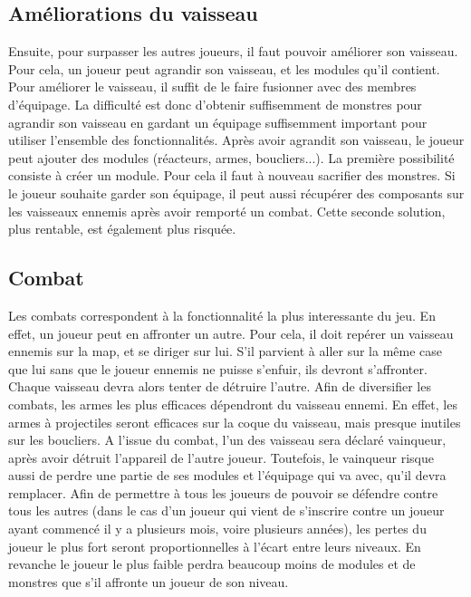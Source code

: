 \documentclass[a4paper,11pt]{report}
\begin{document}
    \subsection{Améliorations du vaisseau}
      Ensuite, pour surpasser les autres joueurs, il faut pouvoir améliorer son vaisseau. Pour cela, un joueur peut agrandir son vaisseau, et les modules qu'il contient.
      \newline
      Pour améliorer le vaisseau, il suffit de le faire fusionner avec des membres d'équipage. La difficulté est donc d'obtenir suffisemment de monstres pour agrandir son vaisseau en gardant un équipage suffisemment important pour utiliser l'ensemble des fonctionnalités.
      \newline
      Après avoir agrandit son vaisseau, le joueur peut ajouter des modules (réacteurs, armes, boucliers...).
      La première possibilité consiste à créer un module. Pour cela il faut à nouveau sacrifier des monstres. 
      Si le joueur souhaite garder son équipage, il peut aussi récupérer des composants sur les vaisseaux ennemis après avoir remporté un combat.
      Cette seconde solution, plus rentable, est également plus risquée.
      
    \subsection{Combat}
      Les combats correspondent à la fonctionnalité la plus interessante du jeu. En effet, un joueur peut en affronter un autre.
      Pour cela, il doit repérer un vaisseau ennemis sur la map, et se diriger sur lui. 
      S'il parvient à aller sur la même case que lui sans que le joueur ennemis ne puisse s'enfuir, ils devront s'affronter.
      Chaque vaisseau devra alors tenter de détruire l'autre. Afin de diversifier les combats, les armes les plus efficaces dépendront du vaisseau ennemi.
      En effet, les armes à projectiles seront efficaces sur la coque du vaisseau, mais presque inutiles sur les boucliers.
      A l'issue du combat, l'un des vaisseau sera déclaré vainqueur, après avoir détruit l'appareil de l'autre joueur. 
      Toutefois, le vainqueur risque aussi de perdre une partie de ses modules et l'équipage qui va avec, qu'il devra remplacer.
      Afin de permettre à tous les joueurs de pouvoir se défendre contre tous les autres (dans le cas d'un joueur qui vient de s'inscrire contre un joueur ayant commencé il y a plusieurs mois, voire plusieurs années), les pertes du joueur le plus fort seront proportionnelles à l'écart entre leurs niveaux.
      En revanche le joueur le plus faible perdra beaucoup moins de modules et de monstres que s'il affronte un joueur de son niveau.
      
\end{document}
